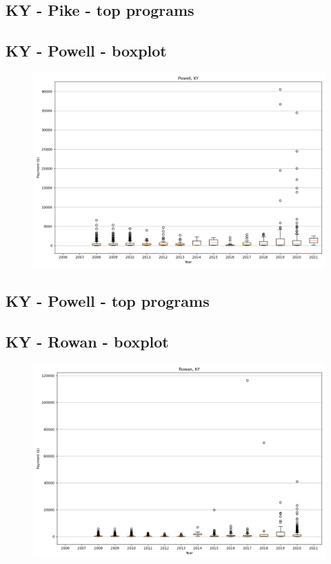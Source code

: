 \subsection*{KY - Pike - top programs}

\newpage
\subsection*{KY - Powell - boxplot}
\begin{figure}[h]
\centering
\includegraphics[width=7in]{../output/boxplots/counties/Powell-KY_boxplot.png}
\end{figure}


\subsection*{KY - Powell - top programs}

\newpage
\subsection*{KY - Rowan - boxplot}
\begin{figure}[h]
\centering
\includegraphics[width=7in]{../output/boxplots/counties/Rowan-KY_boxplot.png}
\end{figure}


